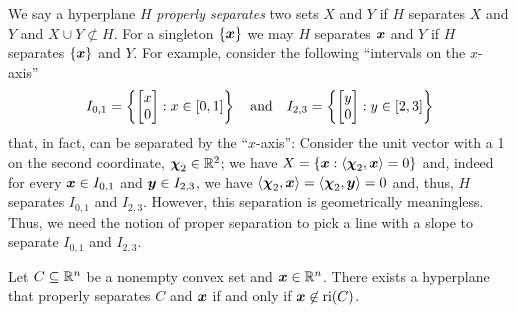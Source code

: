 We say a hyperplane $H$ {\em properly separates} two sets $X$ and $Y$ if $H$ separates $X$ and $Y$ and $ X\cup Y \not\subset H$. For a singleton $\{{\boldsymbol x}\}$ we may $H$ separates ${\boldsymbol x}$ and $Y$ if $H$ separates $\{{\boldsymbol x}\}$ and $Y$. For example, consider the following ``intervals on the $x$-axis''
\[ I_{0, 1} = \left\{\begin{bmatrix} x\\0 \end{bmatrix}: x\in[0, 1]\right\} \quad \text{and}\quad I_{2, 3} =\left\{ \begin{bmatrix} y\\0  \end{bmatrix}: y\in[2, 3]\right\}\] 
that, in fact, can be separated by the ``$x$-axis'': Consider the unit vector with a 1 on the second coordinate, $\boldsymbol\chi_2\in\mathbb R^2$; we have $X = \{{\boldsymbol x}: \left\langle\boldsymbol\chi_2, {\boldsymbol x}\right\rangle = 0\}$
and, indeed for every ${\boldsymbol x}\in I_{0, 1}$ and ${\boldsymbol y}\in I_{2, 3}$, we have $\left\langle\boldsymbol\chi_2, {\boldsymbol x}\right\rangle = \left\langle\boldsymbol\chi_2, {\boldsymbol y}\right\rangle = 0$ and, thus, $H$ separates $I_{0, 1}$ and $I_{2, 3}$. However, this separation is geometrically meaningless. Thus, we need the notion of proper separation to pick a line with a slope to separate $I_{0, 1}$ and $I_{2, 3}$. 

\begin{proposition}\label{thm: proper separation} 
Let $C\subseteq \mathbb R^{n}$ be a nonempty convex set and ${\boldsymbol x}\in\mathbb R^{n}$. There exists a hyperplane that properly separates $C$ and ${\boldsymbol x}$ if and only if ${\boldsymbol x}\not\in\operatorname{ri}(C)$. 
\end{proposition} 

